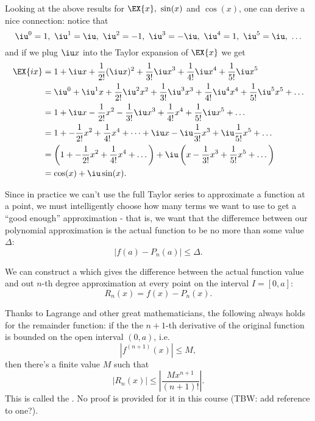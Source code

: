 Looking at the above results for $\EX{x},\ \sin(x)$ and $\cos(x)$, one can derive a nice connection: notice that 
\begin{equation}
	\iu^{0}=1,\ \iu^{1}=\iu,\ \iu^{2}=-1,\ \iu^{3}=-\iu,\ \iu^{4}=1,\ \iu^{5}=\iu,\ \dots
	\label{eq:powers_of_i}
\end{equation}
and if we plug $\iu x$ into the Taylor expansion of $\EX{x}$ we get
\begin{equation}
	\begin{aligned}
		\EX{ix} &= 1 + \iu x + \frac{1}{2!}(\iu x)^{2} + \frac{1}{3!}{\iu x}^{3} + \frac{1}{4!}{\iu x}^{4} + \frac{1}{5!}{\iu x}^{5}\\
				&= \iu^{0} + \iu^{1}x + \frac{1}{2!}\iu^{2}x^{2} + \frac{1}{3!}\iu^{3}x^{3} + \frac{1}{4!}\iu^{4}x^{4} + \frac{1}{5!}\iu^{5}x^{5} + \dots\\
				&= 1 + \iu x - \frac{1}{2!}x^{2} - \frac{1}{3!}\iu x^{3} + \frac{1}{4!}x^{4} + \frac{1}{5!}\iu x^{5} + \dots\\
				&= 1 + - \frac{1}{2!}x^{2} + \frac{1}{4!}x^{4} + \dots + \iu x - \iu\frac{1}{3!}x^{3} + \iu\frac{1}{5!}x^{5} + \dots\\
				&= \left(1 + - \frac{1}{2!}x^{2} + \frac{1}{4!}x^{4} + \dots\right) + \iu \left(x - \frac{1}{3!}x^{3} + \frac{1}{5!}x^{5} + \dots\right)\\
				&= \cos(x) + \iu\sin(x).
	\end{aligned}
	\label{eq:eulers_formula}
\end{equation}

Since in practice we can't use the full Taylor series to approximate a function at a point, we must intelligently choose how many terms we want to use to get a \enquote{good enough} approximation - that is, we want that the differemce between our polynomial approximation is the actual function to be no more than some value $\Delta$:
\begin{equation}
	\left|f(a) - P_{n}(a)\right| \leq \Delta.
	\label{eq:taylor_error_1}
\end{equation}

We can construct a  which gives the difference between the actual function value and out $n$-th degree approximation at every point on the interval $I=[0, a]$:
\begin{equation}
	R_{n}(x) = f(x) - P_{n}(x).
	\label{eq:taylor_error_2}
\end{equation}

Thanks to Lagrange and other great mathematicians, the following always holds for the remainder function: if the the $n+1$-th derivative of the original function is bounded on the open interval $(0, a)$, i.e.
\begin{equation}
	\left| f^{(n+1)}(x) \right| \leq M,
\end{equation}
then there's a finite value $M$ such that
\begin{equation}
	\left| R_{n}(x) \right| \leq \left| \frac{Mx^{n+1}}{(n+1)!} \right|.
	\label{eq:lagrange_error_bound}
\end{equation}
This is called the . No proof is provided for it in this course (TBW: add reference to one?).

